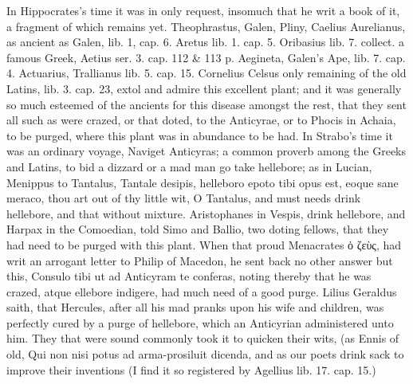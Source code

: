 {In Hippocrates's time it was in only request, insomuch that he writ a
book of it, a fragment of which remains yet. Theophrastus, Galen,
Pliny, Caelius Aurelianus, as ancient as Galen, lib. 1, cap. 6. Aretus
lib. 1. cap. 5. Oribasius lib. 7. collect. a famous Greek, Aetius ser.
3. cap. 112 \& 113 p. Aegineta, Galen's Ape, lib. 7. cap. 4. Actuarius,
Trallianus lib. 5. cap. 15. Cornelius Celsus only remaining of the old
Latins, lib. 3. cap. 23, extol and admire this excellent plant; and it
was generally so much esteemed of the ancients for this disease amongst
the rest, that they sent all such as were crazed, or that doted, to the
Anticyrae, or to Phocis in Achaia, to be purged, where this plant was
in abundance to be had. In Strabo's time it was an ordinary voyage,
Naviget Anticyras; a common proverb among the Greeks and Latins, to bid
a dizzard or a mad man go take hellebore; as in Lucian, Menippus to
Tantalus, Tantale desipis, helleboro epoto tibi opus est, eoque sane
meraco, thou art out of thy little wit, O Tantalus, and must needs
drink hellebore, and that without mixture. Aristophanes in Vespis,
drink hellebore, \etc{} and Harpax in the  Comoedian, told Simo and
Ballio, two doting fellows, that they had need to be purged with this
plant. When that proud Menacrates \textgreek{ὀ ζεὺς}, had writ an arrogant letter
to Philip of Macedon, he sent back no other answer but this, Consulo
tibi ut ad Anticyram te conferas, noting thereby that he was crazed,
atque ellebore indigere, had much need of a good purge. Lilius Geraldus
saith, that Hercules, after all his mad pranks upon his wife and
children, was perfectly cured by a purge of hellebore, which an
Anticyrian administered unto him. They that were sound commonly took it
to quicken their wits, (as Ennis of old, Qui non nisi potus ad
arma-prosiluit dicenda, and as our poets drink sack to improve their
inventions (I find it so registered by Agellius lib. 17. cap. 15.)

}
